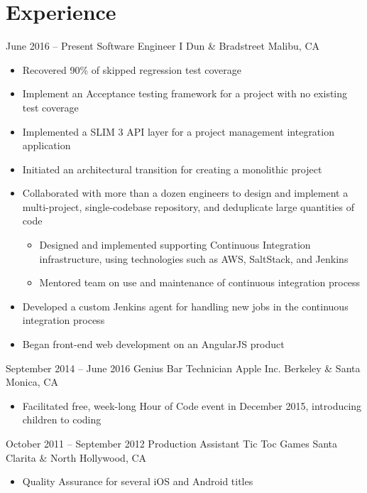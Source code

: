 \documentclass[11pt,a4paper,sans]{moderncv}        %
\begin{document}
\makecvtitle

\section{Experience}        %

\cventry
{June 2016 -- Present}          {Software Engineer I}
{Dun \& Bradstreet}             {Malibu, CA}
{}
{
\begin{itemize}
    \item Recovered 90\% of skipped regression test coverage
    \item Implement an Acceptance testing framework for a project with no existing test coverage
    \item Implemented a SLIM 3 API layer for a project management integration application
    \item Initiated an architectural transition for creating a monolithic project
    \item Collaborated with more than a dozen engineers to design and implement a multi-project, single-codebase repository, and deduplicate large quantities of code
    \begin{itemize}
        \item Designed and implemented supporting Continuous Integration infrastructure, using technologies such as AWS, SaltStack, and Jenkins
        \item Mentored team on use and maintenance of continuous integration process
    \end{itemize}
    \item Developed a custom Jenkins agent for handling new jobs in the continuous integration process
    \item Began front-end web development on an AngularJS product
\end{itemize}
}   %

\cventry
{September 2014 -- June 2016}	{Genius Bar Technician}
{Apple Inc.}	                {Berkeley \& Santa Monica, CA}
{}
{
\begin{itemize}
    \item Facilitated free, week-long Hour of Code event in December 2015, introducing children to coding
\end{itemize}
}   %

\cventry
{October 2011 -- September 2012}	{Production Assistant}
{Tic Toc Games}	{Santa Clarita \& North Hollywood, CA}
{}
{
\begin{itemize}
    \item Quality Assurance for several iOS and Android titles
\end{itemize}
}   %
\end{document}
